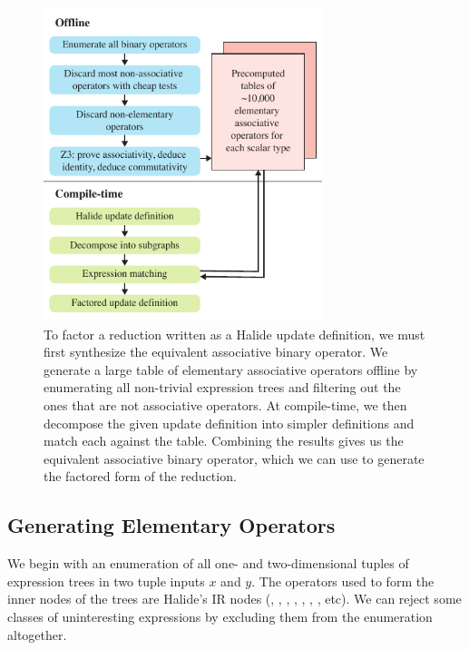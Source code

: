 \begin{figure}[tb]
\centering
\includegraphics[width=3.2in]{system}
\caption{To factor a reduction written as a Halide update definition, we must first synthesize the equivalent associative binary operator. We generate a large table of elementary associative operators offline by enumerating all non-trivial expression trees and filtering out the ones that are not associative operators. At compile-time, we then decompose the given update definition into simpler definitions and match each against the table. Combining the results gives us the equivalent associative binary operator, which we can use to generate the factored form of the reduction.}
\label{fig:system}
\end{figure}



\subsection{Generating Elementary Operators}
\label{subsec:generation}

We begin with an enumeration of all one- and two-dimensional tuples of expression trees in two tuple inputs $x$ and $y$. The operators used to form the inner nodes of the trees are Halide's IR nodes (\code{*}, \code{+}, \code{-}, , , , \code{<}, etc). We can reject some classes of uninteresting expressions by excluding them from the enumeration altogether.

